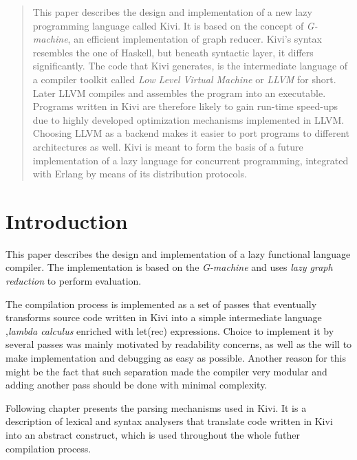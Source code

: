 \documentclass[12pt,a4paper]{report}
\begin{document}
\Huge
\begin{abstract}
  \normalsize
  \center
  This paper describes the design and implementation of a new lazy programming
  language called Kivi. It is based on the concept of \textit{G-machine}, an
  efficient implementation of graph reducer. Kivi's syntax resembles the one of
  Haskell, but beneath syntactic layer, it differs significantly. The code that
  Kivi generates, is the intermediate language of a compiler toolkit called
  \textit{Low Level Virtual Machine}\cite{website:llvm} or \textit{LLVM} for
  short.  Later LLVM compiles and assembles the program into an executable.
  Programs written in Kivi are therefore likely to gain run-time speed-ups due
  to highly developed optimization mechanisms implemented in LLVM. Choosing
  LLVM as a backend makes it easier to port programs to different architectures
  as well.  Kivi is meant to form the basis of a future implementation of a
  lazy language for concurrent programming, integrated with Erlang by means of
  its distribution protocols.
\end{abstract}

\normalsize

\tableofcontents

\chapter{Introduction}

This paper describes the design and implementation of a lazy functional
language compiler. The implementation is based on the
\textit{G-machine}\cite{Jon87} and uses \textit{lazy graph reduction} to
perform evaluation.

The compilation process is implemented as a set of passes that eventually
transforms source code written in Kivi into a simple intermediate language
,\textit{lambda calculus} enriched with let(rec) expressions. Choice to
implement it by several passes was mainly motivated by readability concerns, as
well as the will to make implementation and debugging as easy as possible.
Another reason for this might be the fact that such separation made the
compiler very modular and adding another pass should be done with minimal
complexity.

Following chapter presents the parsing mechanisms used in Kivi. It is a description
of lexical and syntax analysers that translate code written in Kivi into an
abstract construct, which is used throughout the whole futher compilation
process.
\end{document}
